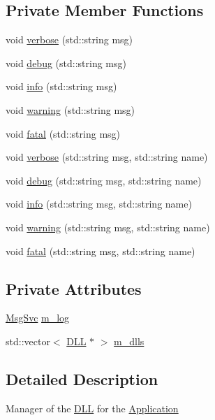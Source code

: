 \subsection*{Private Member Functions}
\begin{DoxyCompactItemize}
\item 
void \hyperlink{classDLLMgr_a47c406fbca0df2aaa8569e0e99927d32}{verbose} (std::string msg)
\item 
void \hyperlink{classDLLMgr_ad5f2427768e6cfe25c255e7899e4203f}{debug} (std::string msg)
\item 
void \hyperlink{classDLLMgr_a14b8e15b87602027c0a11f91173bebed}{info} (std::string msg)
\item 
void \hyperlink{classDLLMgr_ad8a177de233cda457b5566e4ff3bb50e}{warning} (std::string msg)
\item 
void \hyperlink{classDLLMgr_ac45919d4588b964a7ca3a8e2abed3cc2}{fatal} (std::string msg)
\item 
void \hyperlink{classDLLMgr_a7a7c039320f83aac50f315ed608d67e3}{verbose} (std::string msg, std::string name)
\item 
void \hyperlink{classDLLMgr_aef993dc0eea2972286957dda940ccdf2}{debug} (std::string msg, std::string name)
\item 
void \hyperlink{classDLLMgr_ac6468f1f9079b683ce5fe60e1d697dda}{info} (std::string msg, std::string name)
\item 
void \hyperlink{classDLLMgr_a84fc9787ced567adb5695fc1d7c275b8}{warning} (std::string msg, std::string name)
\item 
void \hyperlink{classDLLMgr_add7f622101c74721181402ba26072668}{fatal} (std::string msg, std::string name)
\end{DoxyCompactItemize}
\subsection*{Private Attributes}
\begin{DoxyCompactItemize}
\item 
\hyperlink{classMsgSvc}{MsgSvc} \hyperlink{classDLLMgr_a64b523faed64378451ee76f6fbf0800d}{m\_\-log}
\item 
std::vector$<$ \hyperlink{classDLL}{DLL} $\ast$ $>$ \hyperlink{classDLLMgr_a5bd713edea21d64f32aa71162bca581a}{m\_\-dlls}
\end{DoxyCompactItemize}


\subsection{Detailed Description}
Manager of the \hyperlink{classDLL}{DLL} for the \hyperlink{classApplication}{Application}

